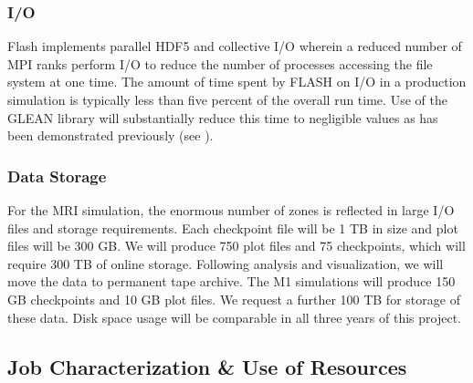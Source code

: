\subsubsection{I/O}
Flash implements parallel HDF5 and collective I/O wherein a reduced
number of MPI ranks perform I/O to reduce the number of processes
accessing the file system at one time. The amount of time spent by
FLASH on I/O in a production simulation is typically less than five
percent of the overall run time. Use of the GLEAN library will
substantially reduce this time to negligible values as has been
demonstrated previously (see \citet{vishwanath2011}).

\subsubsection{Data Storage}
For the MRI simulation, the enormous number of zones is reflected
in large I/O files and storage requirements.  Each checkpoint file
will be 1 TB in size and plot files will be 300 GB.  We will produce
750 plot files and 75 checkpoints, which will require 300 TB of online
storage.  Following analysis and visualization, we will move the data
to permanent tape archive.
The M1 simulations will produce 150 GB checkpoints and 10 GB plot files.
We request a further 100 TB for storage of these data.
Disk space usage will be comparable in all three years of this project.

\subsection{Job Characterization \& Use of Resources}
\label{sec:jobs}

